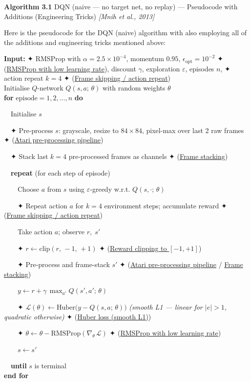 \documentclass[11pt]{article}
\begin{document}
    \begin{pseudobox}

\textbf{Algorithm 3.1} DQN (naive --- no target net, no replay) ---
Pseudocode with Additions (Engineering Tricks) \emph{{[}Mnih et al.,
2013{]}}

\tcbline

Here is the pseudocode for the DQN (naive) algorithm with also employing
all of the additions and engineering tricks mentioned above:

\textbf{Input:} ✦ RMSProp with \(\alpha\!=\!2.5\!\times\!10^{-4}\),
momentum \(0.95\), \(\epsilon_\text{opt}\!=\!10^{-2}\) ✦
(\hyperref[trick-3-1-6]{RMSProp with low learning rate}), discount
\(\gamma\), exploration \(\varepsilon\), episodes \(n\), ✦ action repeat
\(k\!=\!4\) ✦ (\hyperref[trick-3-1-2]{Frame skipping / action repeat})\\
Initialise \(Q\)-network \(Q(s, a;\, \theta)\) with random weights
\(\theta\)\\
\textbf{for} \(\text{episode} = 1, 2, \ldots, n\) \textbf{do}\\
\strut ~~Initialise \(s\)\\
\strut ~~✦ Pre-process \(s\): grayscale, resize to \(84\!\times\!84\),
pixel-max over last 2 raw frames ✦ (\hyperref[trick-3-1-4]{Atari
pre-processing pipeline})\\
\strut ~~✦ Stack last \(k\!=\!4\) pre-processed frames as channels ✦
(\hyperref[trick-3-1-3]{Frame stacking})\\
\strut ~~\textbf{repeat} (for each step of episode)\\
\strut ~~~~Choose \(a\) from \(s\) using \(\varepsilon\)-greedy w.r.t.
\(Q(s, \cdot;\, \theta)\)\\
\strut ~~~~✦ Repeat action \(a\) for \(k\!=\!4\) environment steps;
accumulate reward ✦ (\hyperref[trick-3-1-2]{Frame skipping / action
repeat})\\
\strut ~~~~Take action \(a\); observe \(r,\; s'\)\\
\strut ~~~~✦ \(r \leftarrow \mathrm{clip}(r,\, -1,\, +1)\) ✦
(\hyperref[trick-3-1-1]{Reward clipping to \([-1,+1]\)})\\
\strut ~~~~✦ Pre-process and frame-stack \(s'\) ✦
(\hyperref[trick-3-1-4]{Atari pre-processing pipeline} /
\hyperref[trick-3-1-3]{Frame stacking})\\
\strut ~~~~\(y \leftarrow r + \gamma\, \max_{a'} Q(s', a';\, \theta)\)\\
\strut ~~~~✦
\(\mathcal{L}(\theta) \leftarrow \mathrm{Huber}\bigl(y - Q(s, a;\, \theta)\bigr)\)
\emph{(smooth L1 --- linear for \(|e|>1\), quadratic otherwise)} ✦
(\hyperref[trick-3-1-5]{Huber loss (smooth L1)})\\
\strut ~~~~✦
\(\theta \leftarrow \theta - \mathrm{RMSProp}(\nabla_\theta\, \mathcal{L})\)
✦ (\hyperref[trick-3-1-6]{RMSProp with low learning rate})\\
\strut ~~~~\(s \leftarrow s'\)\\
\strut ~~\textbf{until} \(s\) is terminal\\
\textbf{end for}

\end{pseudobox}
\end{document}

